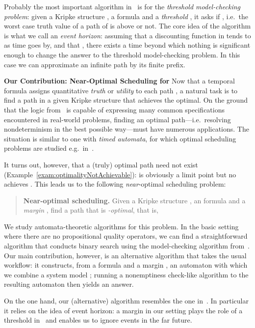 \documentclass[a4paper,USenglish,numberwithinsect]{lipics}
\theoremstyle{definition}
\theoremstyle{remark}
\theoremstyle{plain}
\begin{document}
Probably the most important algorithm in~\cite{AlmagorBK14} is for the
\emph{threshold model-checking problem}: given a Kripke structure ,
a formula  and a \emph{threshold} , it asks if 
, i.e.\ 
the
worst case truth value of a path of  is above  or
not.
The core idea of
 the algorithm
is what we call an \emph{event horizon}: assuming that a discounting
function  in  tends to  as time goes by, and
that , there exists a time beyond which nothing is 
significant enough
to change the answer to the threshold model-checking problem.
In this case we can approximate an infinite path by its finite prefix.


\noindent
\textbf{Our Contribution: Near-Optimal Scheduling for
}\quad
Now that a temporal formula  assigns quantitative \emph{truth}
or \emph{utility}  to each path , a natural task is
to find a path  in a given Kripke structure  that achieves the
optimal. On the ground that the logic  from~\cite{AlmagorBK14} is capable of 
expressing many common specifications encountered in real-world
problems, finding an optimal path---i.e.\ resolving nondeterminism in
the best possible way---must have numerous applications. The situation
is similar to one with \emph{timed automata}, for which optimal
scheduling problems are studied e.g.\ in~\cite{AbdeddaimAM06}. 


It turns out, however, that 
a (truly) optimal path need not exist
(Example~\ref{exam:optimalityNotAchievable}):
 is obviously a limit point but no
 achieves . This leads us to the
following \emph{near}-optimal scheduling problem:
\begin{quote}
 \textbf{Near-optimal scheduling.}
 Given a Kripke structure , an  formula  and a
 \emph{margin}
 , find a path  that is
 \emph{-optimal}, that is,
 
\end{quote}
We study automata-theoretic algorithms
for this problem. In the basic setting where there are no propositional
quality operators, we can find  a straightforward algorithm  that conducts
binary search using the model-checking algorithm
from~\cite{AlmagorBK14}. 
Our main contribution, however,  is
 an alternative algorithm  that
takes the usual workflow: it
constructs, from
a formula  and a margin , 
 an automaton 
 with which we combine a system model ;
running a nonemptiness check-like algorithm to the resulting automaton then
yields an answer. 

On  the one hand, our (alternative) algorithm  resembles the one in~\cite{AlmagorBK14}. 
In particular it  relies on the idea of event horizon:
a margin  in our setting plays the role
of a threshold  in~\cite{AlmagorBK14} and
enables us to ignore events in the far future.
\end{document}
